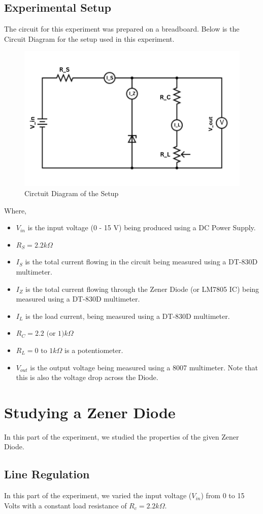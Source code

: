 \documentclass[10pt]{scrartcl}
\theoremstyle{definition}
\begin{document}
\subsection{Experimental Setup}
The circuit for this experiment was prepared on a breadboard.
Below is the Circuit Diagram for the setup used in this experiment.

\begin{figure}[!h]
    \centering
    \includegraphics[width=0.6\linewidth]{circuit.png}
    \caption{Circtuit Diagram of the Setup}
\end{figure}
Where, 
\begin{itemize}
    \item $V_{in}$ is the input voltage (0 - 15 V) being produced using a DC Power Supply.
    \item $R_S = 2.2 k\Omega$
    \item $I_S$ is the total current flowing in the circuit being measured using a DT-830D multimeter.
    \item $I_Z$ is the total current flowing through the Zener Diode (or LM7805 IC) being measured using a DT-830D multimeter.
    \item $I_L$ is the load current, being measured using a DT-830D multimeter.
    \item $R_C = 2.2 \text{ (or $1$)} k\Omega$
    \item $R_L = 0 \text{ to } 1 k\Omega$ is a potentiometer.
    \item $V_{out}$ is the output voltage being measured using a 8007 multimeter. Note that this is also
        the voltage drop across the Diode.
\end{itemize}

\clearpage
\section{Studying a Zener Diode}
In this part of the experiment, we studied the properties of the given Zener Diode.
\subsection{Line Regulation}
In this part of the experiment, we varied the input voltage ($V_{in}$) from 0 to 15 Volts
with a constant load resistance of $R_c = 2.2 k\Omega$. 
\end{document}
